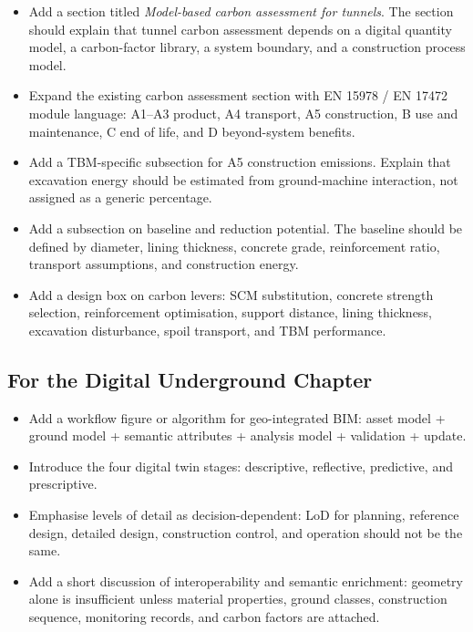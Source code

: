 \documentclass[11pt]{article}
\begin{document}
\begin{itemize}
  \item Add a section titled \textit{Model-based carbon assessment for tunnels}.
  The section should explain that tunnel carbon assessment depends on a digital
  quantity model, a carbon-factor library, a system boundary, and a construction
  process model.
  \item Expand the existing carbon assessment section with EN 15978 /
  EN 17472 module language: A1--A3 product, A4 transport, A5 construction, B
  use and maintenance, C end of life, and D beyond-system benefits.
  \item Add a TBM-specific subsection for A5 construction emissions. Explain
  that excavation energy should be estimated from ground-machine interaction,
  not assigned as a generic percentage.
  \item Add a subsection on baseline and reduction potential. The baseline
  should be defined by diameter, lining thickness, concrete grade, reinforcement
  ratio, transport assumptions, and construction energy.
  \item Add a design box on carbon levers: SCM substitution, concrete strength
  selection, reinforcement optimisation, support distance, lining thickness,
  excavation disturbance, spoil transport, and TBM performance.
\end{itemize}

\subsection*{For the Digital Underground Chapter}

\begin{itemize}
  \item Add a workflow figure or algorithm for geo-integrated BIM:
  asset model + ground model + semantic attributes + analysis model +
  validation + update.
  \item Introduce the four digital twin stages: descriptive, reflective,
  predictive, and prescriptive.
  \item Emphasise levels of detail as decision-dependent: LoD for planning,
  reference design, detailed design, construction control, and operation should
  not be the same.
  \item Add a short discussion of interoperability and semantic enrichment:
  geometry alone is insufficient unless material properties, ground classes,
  construction sequence, monitoring records, and carbon factors are attached.
\end{itemize}
\end{document}

